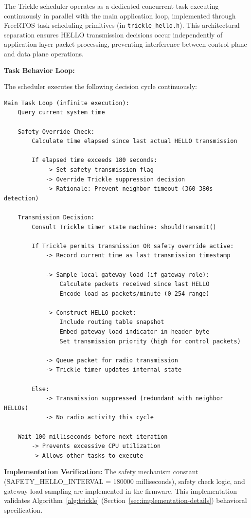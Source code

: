 The Trickle scheduler operates as a dedicated concurrent task executing continuously in parallel with the main application loop, implemented through FreeRTOS task scheduling primitives (in \texttt{trickle\_hello.h}). This architectural separation ensures HELLO transmission decisions occur independently of application-layer packet processing, preventing interference between control plane and data plane operations.

\textbf{Task Behavior Loop:}

The scheduler executes the following decision cycle continuously:

\begin{verbatim}
Main Task Loop (infinite execution):
    Query current system time

    Safety Override Check:
        Calculate time elapsed since last actual HELLO transmission

        If elapsed time exceeds 180 seconds:
            -> Set safety transmission flag
            -> Override Trickle suppression decision
            -> Rationale: Prevent neighbor timeout (360-380s detection)

    Transmission Decision:
        Consult Trickle timer state machine: shouldTransmit()

        If Trickle permits transmission OR safety override active:
            -> Record current time as last transmission timestamp

            -> Sample local gateway load (if gateway role):
                Calculate packets received since last HELLO
                Encode load as packets/minute (0-254 range)

            -> Construct HELLO packet:
                Include routing table snapshot
                Embed gateway load indicator in header byte
                Set transmission priority (high for control packets)

            -> Queue packet for radio transmission
            -> Trickle timer updates internal state

        Else:
            -> Transmission suppressed (redundant with neighbor HELLOs)
            -> No radio activity this cycle

    Wait 100 milliseconds before next iteration
        -> Prevents excessive CPU utilization
        -> Allows other tasks to execute
\end{verbatim}

\textbf{Implementation Verification:} The safety mechanism constant (SAFETY\_HELLO\_INTERVAL = 180000 milliseconds), safety check logic, and gateway load sampling are implemented in the firmware. This implementation validates Algorithm~\ref{alg:trickle} (Section~\ref{sec:implementation-details}) behavioral specification.

